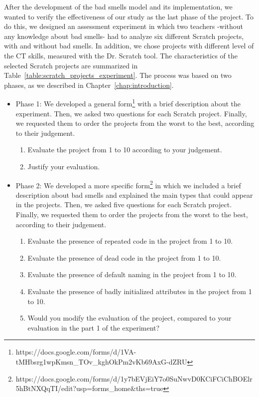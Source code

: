 After the development of the bad smells model and its implementation, we wanted to verify the effectiveness of our study as the last phase of the project. To do this, we designed an assessment experiment in which two teachers -without any knowledge about bad smells- had to analyze six different Scratch projects, with and without bad smells. In addition, we chose projects with different level of the CT skills, measured with the Dr. Scratch tool. The characteristics of the selected Scratch projects are summarized in Table~\ref{table:scratch_projects_experiment}. The process was based on two phases, as we described in Chapter~\ref{chap:introduction}.

\begin{itemize}
    \item Phase 1: We developed a general form\footnote{https://docs.google.com/forms/d/1VA-tMHbsrg1wpKmsn\_TOv\_kghOkPm2vKb69AxG-dZRU} with a brief description about the experiment. Then, we asked two questions for each Scratch project. Finally, we requested them to order the projects from the worst to the best, according to their judgement. 
    \begin{enumerate}
        \item Evaluate the project from 1 to 10 according to your judgement.
        \item Justify your evaluation.
    \end{enumerate}
    \item Phase 2: We developed a more specific form\footnote{https://docs.google.com/forms/d/1y7bEVjEiY7o0SuNwvD0KCiFCiChBOElr5hBtNXQqT\-I/edit?usp=forms\_home\&ths=true} in which we included a brief description about bad smells and explained the main types that could appear in the projects. Then, we asked five questions for each Scratch project. Finally, we requested them to order the projects from the worst to the best, according to their judgement. 
    \begin{enumerate}
        \item Evaluate the presence of repeated code in the project from 1 to 10.
        \item Evaluate the presence of dead code in the project from 1 to 10.
        \item Evaluate the presence of default naming in the project from 1 to 10.
        \item Evaluate the presence of badly initialized attributes in the project from 1 to 10.
        \item Would you modify the evaluation of the project, compared to your evaluation in the part 1 of the experiment?
    \end{enumerate}
\end{itemize}

